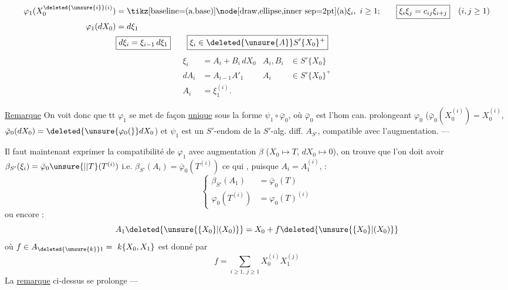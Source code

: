 \[
\begin{aligned}
\varphi_1(X_0^{\deleted{\unsure{i}}(i)})&=\text{\tikz[baseline=(a.base)]\node[draw,ellipse,inner sep=2pt](a){$\xi_i,\ i\geq1$};}\qquad
\boxed{\xi_i\xi_j=c_{ij}\xi_{i+j}}\quad(i,j\geq1)\\
\varphi_1(dX_0)&=d\xi_1\\
&\boxed{d\xi_i=\xi_{i-1}\,d\xi_1}\qquad\boxed{\xi_i\in\deleted{\unsure{A}}S'\{X_0\}^+}
\end{aligned}
\]
\[
\begin{aligned}
\xi_i&=A_i+B_i\,dX_0& A_i,B_i&\in S'\{X_0\}\\
dA_i&=A_{i-1}A'_1& A_i&\in S'\{X_0\}^+\\
A_i&=\xi_1^{(i)}.
\end{aligned}
\]

\uline{Remarque} On voit donc que tt $\varphi_1$ se met de façon \uline{unique} sous la forme $\psi_1\circ\bar\varphi_0$, où $\bar\varphi_0$ est l'hom can. prolongeant
$\varphi_0$ ($\bar\varphi_0(X_0^{(i)})=X_0^{(i)}$, $\bar\varphi_0(dX_0)=\deleted{\unsure{\varphi_0(}}dX_0$) et $\psi_1$ est un $S'$-endom de la $S'$-alg. diff. $A_{S'}$, compatible avec l'augmentation. ---

Il faut maintenant exprimer  la compatibilité de $\varphi_1$ avec augmentation $\beta$ ($X_0\longmapsto T$,  $dX_0\longmapsto0$), on trouve que l'on doit avoir
$\beta_{S'}(\xi_i)=\bar\varphi_0\unsure{\vert|T}(T^{(i)})$ i.e.  $\beta_{S'}(A_i)=\bar\varphi_0(T^{(i)})$
ce qui , puisque $A_i=A_1^{(i)}$, :
\[
\left\{\begin{aligned}
\beta_{S'}(A_1)&=\bar\varphi_0(T)\\
\varphi_0(T^{(i)})&=\varphi_0(T)^{(i)}
\end{aligned}\right.
\]
ou encore :
\[
A_1\deleted{\unsure{\{X_0\}|(X_0)}}=X_0+f\deleted{\unsure{\{X_0\}|(X_0)}}
\]
où $\displaystyle f\in A_{\deleted{\unsure{k}}1}=\ k\{X_0,X_1\}$
est donné par
\[
f=\sum_{i\geq1,\,j\geq1}X_0^{(i)}X_1^{(j)}
\]
La \uline{remarque} ci-dessus se prolonge ---
